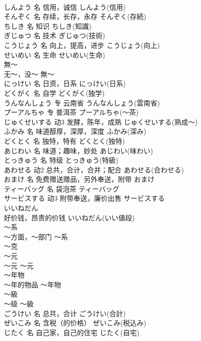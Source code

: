 \documentclass[8pt]{extreport}
\begin{document}
\begin{CJK}{UTF8}{min}
\\	しんよう	名	信用，诚信	しんよう(信用)	
\\	そんぞく	名	存续，长存，永存	そんぞく(存続)	
\\	ちしき	名	知识	ちしき(知識)	
\\	ぎじゅつ	名	技术	ぎじゅつ(技術)	
\\	こうじょう	名	向上，提高，进步	こうじょう(向上)	
\\	せいめい	名	生命	せいめい(生命)	
\\	無～	
\\	无～，没～	無～	
\\	にっけい	名	日资，日系	にっけい(日系)	
\\	どくがく	名	自学	どくがく(独学)	
\\	うんなんしょう	专	云南省	うんなんしょう(雲南省)	
\\	プーアルちゃ	专	普洱茶	プーアルちゃ(～茶)	
\\	じゅくせいする	动3	发酵，陈年，成熟	じゅくせいする(熟成～)	
\\	ふかみ	名	味道醇厚，深厚，深度	ふかみ(深み)	
\\	どくとく	名	独特，特有	どくとく(独特)	
\\	あじわい	名	味道；趣味，妙处	あじわい(味わい)	
\\	とっきゅう	名	特级	とっきゅう(特級)	
\\	あわせる	动2	总共，合计，合并；配合	あわせる(合わせる)	
\\	おまけ	名	免费赠送赠品，另外奉送，附带	おまけ	
\\	ティーバッグ	名	袋泡茶	ティーバッグ	
\\	サービスする	动3	附带奉送，廉价出售	サービスする	
\\	いいねだん	
\\	好价钱，昂贵的价钱	いいねだん(いい値段)	
\\	～系	
\\	～方面，～部门	～系	
\\	～克	
\\	～元	
\\	～元	～元	
\\	～年物	
\\	～年的物品	～年物	
\\	～級	
\\	～级	～級	
\\	ごうけい	名	总共，合计	ごうけい(合計)	
\\	ぜいこみ	名	含税（的价格）	ぜいこみ(税込み)	
\\	じたく	名	自己家，自己的住宅	じたく(自宅)	

\end{CJK}
\end{document}
